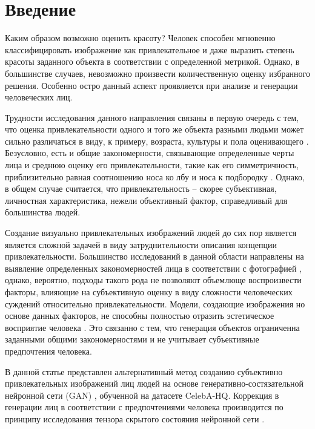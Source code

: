 \documentclass[60x84/16,8pt]{ittmm}
\begin{document}
\section{Введение}
\label{sec:intro}

Каким образом возможно оценить красоту? Человек способен мгновенно классифицировать
изображение как привлекательное и даже выразить степень красоты заданного объекта в соответствии с определенной метрикой.
Однако, в большинстве случаев, невозможно произвести количественную оценку избранного решения.
Особенно остро данный аспект проявляется при анализе и генерации человеческих лиц.

Трудности исследования данного направления связаны в первую очередь с тем, что
оценка привлекательности одного и того же объекта разными людьми может сильно различаться
в виду, к примеру, возраста, культуры и пола оценивающего
\cite{facial-attractiveness-1, facial-attractiveness-2, facial-attractiveness-3}.
Безусловно, есть и общие закономерности, связывающие определенные черты лица
и среднюю оценку его привлекательности, такие как его симметричность, приблизительно
равная соотношению носа ко лбу и носа к подбородку \cite{facial-attractiveness-math-1}.
Однако, в общем случае считается, что привлекательность -- скорее субъективная, личностная характеристика,
нежели объективный фактор, справедливый для большинства людей.

Создание визуально привлекательных изображений людей до сих пор
является является сложной задачей в виду затруднительности описания
концепции привлекательности. Большинство исследований в данной области
направлены на выявление определенных закономерностей лица в соответствии
с фотографией \cite{facial-attractiveness-math-2, facial-attractiveness-math-3, facial-attractiveness-math-4},
однако, вероятно, подходы такого рода не позволяют объемлюще воспроизвести
факторы, влияющие на субъективную оценку в виду сложности человеческих суждений
относительно привлекательности. Модели, создающие изображения но основе данных
факторов, не способны полностью отразить эстетическое восприятие человека \cite{attr-models-complicated}.
Это связанно с тем, что генерация объектов ограниченна заданными
общими закономерностями и не учитывает субъективные предпочтения человека.

В данной статье представлен альтернативный метод созданию субъективно привлекательных
изображений лиц людей на основе генеративно-состязательной нейронной сети (GAN) \cite{gan}, обученной на датасете CelebA-HQ.
Коррекция в генерации лиц в соответствии с предпочтениями человека производится
по принципу исследования тензора скрытого состояния нейронной сети \cite{latent-space-exploration}. 
\end{document}
